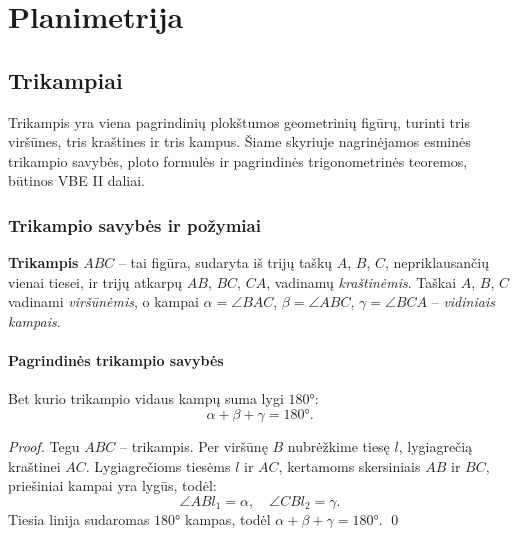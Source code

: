 \chapter{Planimetrija}

\section{Trikampiai}

Trikampis yra viena pagrindinių plokštumos geometrinių figūrų, turinti tris viršūnes,
tris kraštines ir tris kampus. Šiame skyriuje nagrinėjamos esminės trikampio savybės,
ploto formulės ir pagrindinės trigonometrinės teoremos, būtinos VBE II daliai.

\subsection{Trikampio savybės ir požymiai}

\begin{definition}
\textbf{Trikampis} $ABC$ – tai figūra, sudaryta iš trijų taškų $A$, $B$, $C$,
nepriklausančių vienai tiesei, ir trijų atkarpų $AB$, $BC$, $CA$, vadinamų
\emph{kraštinėmis}. Taškai $A$, $B$, $C$ vadinami \emph{viršūnėmis}, o kampai
$\alpha = \angle BAC$, $\beta = \angle ABC$, $\gamma = \angle BCA$ – \emph{vidiniais kampais}.
\end{definition}

\subsubsection*{Pagrindinės trikampio savybės}

\begin{theorem}
Bet kurio trikampio vidaus kampų suma lygi $180°$:
\[
\alpha + \beta + \gamma = 180°.
\]
\end{theorem}

\begin{proof}
Tegu $ABC$ – trikampis. Per viršūnę $B$ nubrėžkime tiesę $l$, lygiagrečią kraštinei $AC$.
Lygiagrečioms tiesėms $l$ ir $AC$, kertamoms skersiniais $AB$ ir $BC$,
priešiniai kampai yra lygūs, todėl:
\[
\angle ABl_1 = \alpha, \quad \angle CBl_2 = \gamma.
\]
Tiesia linija sudaromas $180°$ kampas, todėl
$\alpha + \beta + \gamma = 180°$. \qed
\end{proof}

